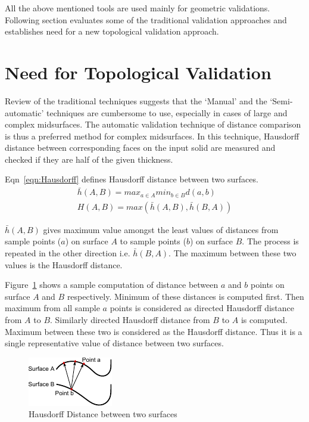 All the above mentioned tools are used mainly for geometric validations. Following section evaluates some of the traditional validation approaches and establishes need for a new topological validation approach.

\section{Need for Topological Validation}\label{sec:topoval:need}

Review of the traditional techniques suggests that the `Manual' and the `Semi-automatic' techniques are cumbersome to use, especially in cases of large and complex midsurfaces. The automatic validation technique of distance comparison is thus a preferred method for complex midsurfaces. In this technique, Hausdorff distance between corresponding faces on the input solid are measured and checked if they are half of the given thickness. 

Eqn~\ref{eqn:Hausdorff} defines Hausdorff distance between two surfaces.%
\begin{equation*}\label{eqn:Hausdorff}  
\begin{aligned}
\bar{h}(A,B) = max_{a \in A} min_{b \in B} d(a,b) \\
H(A,B) = max (\bar{h}(A,B),\bar{h}(B,A))
\end{aligned}
\end{equation*}

$\bar{h}(A,B)$ gives maximum value amongst the least values of distances from sample points ($a$) on surface $A$ to sample points ($b$) on surface $B$. The process is repeated in the other direction i.e. $\bar{h}(B,A)$. The maximum between these two values is the Hausdorff distance.

Figure~\ref{fig:litsurvey:housdorff} shows a sample computation of distance between $a$ and $b$ points on surface $A$ and $B$ respectively. Minimum of these distances is computed first. Then maximum from all sample $a$ points is considered as directed Hausdorff distance from $A$ to $B$. Similarly directed Hausdorff distance from $B$ to $A$ is computed. Maximum between these two is considered as the Hausdorff distance. Thus it is a single representative value of distance between two surfaces.


\begin{figure}[!h]
\centering     %
\includegraphics[width=0.35\linewidth,valign=t]{../Common/images/hausdorff.pdf}
\caption{Hausdorff Distance between two surfaces}
\label{fig:litsurvey:housdorff}
\end{figure}

